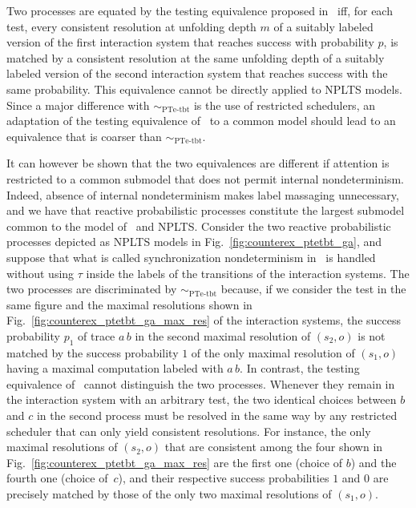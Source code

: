 \documentclass{LMCS}
\newcommand{\sbis}[1]
	{\sim_{#1}}
\begin{document}
Two processes are equated by the testing equivalence proposed in~\cite{GA12} iff, for each test, every
consistent resolution at unfolding depth $m$ of a suitably labeled version of the first interaction system
that reaches success with probability $p$, is matched by a consistent resolution at the same unfolding depth
of a suitably labeled version of the second interaction system that reaches success with the same
probability. This equivalence cannot be directly applied to NPLTS models. Since a major difference with
$\sbis{\textrm{PTe-tbt}}$ is the use of restricted schedulers, an adaptation of the testing equivalence
of~\cite{GA12} to a common model should lead to an equivalence that is coarser than
$\sbis{\textrm{PTe-tbt}}$.

It can however be shown that the two equivalences are different if attention is restricted to a common
submodel that does not permit internal nondeterminism. Indeed, absence of internal nondeterminism makes
label massaging unnecessary, and we have that reactive probabilistic processes constitute the largest
submodel common to the model of~\cite{GA12} and NPLTS. Consider the two reactive probabilistic processes
depicted as NPLTS models in Fig.~\ref{fig:counterex_ptetbt_ga}, and suppose that what is called
synchronization nondeterminism in~\cite{GA12} is handled without using $\tau$ inside the labels of the
transitions of the interaction systems. The two processes are discriminated by $\sbis{\textrm{PTe-tbt}}$
because, if we consider the test in the same figure and the maximal resolutions shown in
Fig.~\ref{fig:counterex_ptetbt_ga_max_res} of the interaction systems, the success probability $p_{1}$ of
trace $a \, b$ in the second maximal resolution of $(s_{2}, o)$ is not matched by the success probability
$1$ of the only maximal resolution of $(s_{1}, o)$ having a maximal computation labeled with $a \, b$. In
contrast, the testing equivalence of~\cite{GA12} cannot distinguish the two processes. \linebreak Whenever
they remain in the interaction system with an arbitrary test, the two identical choices between $b$ and $c$
in the second process must be resolved in the same way by any restricted scheduler that can only yield
consistent resolutions. For instance, the only maximal resolutions of $(s_{2}, o)$ that are consistent among
the four shown in Fig.~\ref{fig:counterex_ptetbt_ga_max_res} are the first one (choice of $b$) and the
fourth one (choice of~$c$), and their respective success probabilities $1$ and $0$ are precisely matched by
those of the only two maximal resolutions of $(s_{1}, o)$.
\end{document}
